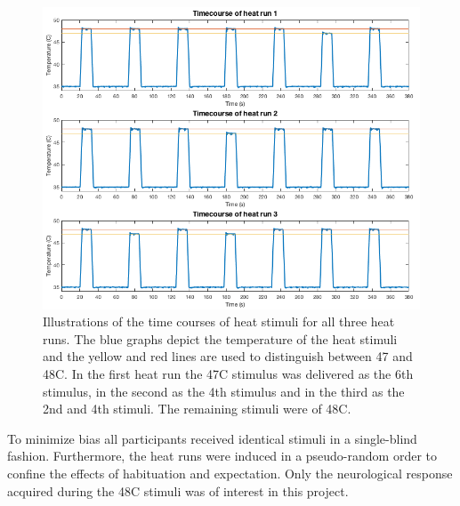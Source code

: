 \begin{figure}[H]                 
	\includegraphics[width=.95\textwidth]{figures/bMethods/Stim_design} 
	 \caption{Illustrations of the time courses of heat stimuli for all three heat runs. The blue graphs depict the temperature of the heat stimuli and the yellow and red lines are used to distinguish between 47 and 48\degree C. In the first heat run the 47\degree C stimulus was delivered as the 6th stimulus, in the second as the 4th stimulus and in the third as the 2nd and 4th stimuli. The remaining stimuli were of 48\degree C.}
	\label{fig:meth:stimdesign} 
\end{figure}

To minimize bias all participants received identical stimuli in a single-blind fashion. Furthermore, the heat runs were induced in a pseudo-random order to confine the effects of habituation and expectation. Only the neurological response acquired during the 48\degree C stimuli was of interest in this project. 
 

